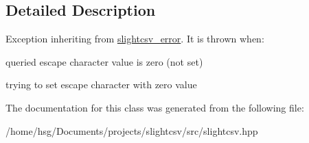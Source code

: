 \subsection{Detailed Description}
Exception inheriting from \hyperlink{classutils_1_1slightcsv__error}{slightcsv\+\_\+error}. It is thrown when\+:
\begin{DoxyItemize}
\item queried escape character value is zero (not set)
\item trying to set escape character with zero value 
\end{DoxyItemize}

The documentation for this class was generated from the following file\+:\begin{DoxyCompactItemize}
\item 
/home/hsg/\+Documents/projects/slightcsv/src/slightcsv.\+hpp\end{DoxyCompactItemize}
